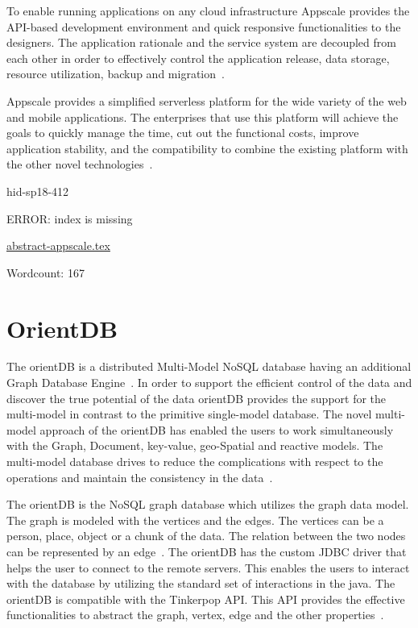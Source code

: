 To enable running applications on any cloud infrastructure Appscale 
provides the API-based development environment and quick responsive 
functionalities to the designers. The application rationale and the 
service system are decoupled from each other in order to effectively 
control the application release, data storage, resource utilization, 
backup and migration~\cite{hid-sp18-412-wiki_appscale}.

Appscale provides a simplified serverless platform for the wide 
variety of the web and mobile applications. The enterprises that use 
this platform will achieve the goals to quickly manage the time, 
cut out the functional costs, improve application stability, and 
the compatibility to combine the existing platform with the other 
novel technologies~\cite{hid-sp18-412-git_appscale}.





\begin{IU}

hid-sp18-412

ERROR: index is missing

\href{https://github.com/cloudmesh-community/hid-sp18-412/blob/master//technology/abstract-appscale.tex}{abstract-appscale.tex}

 

Wordcount: 167

\end{IU}

\section{OrientDB}
The orientDB  is a distributed Multi-Model NoSQL database having an additional
Graph Database Engine~\cite{hid-sp18-412-orientDB_by_CallidusCloud}. In order
to support the efficient control of the data and
discover the true potential of the data orientDB provides the support for the
multi-model in contrast to the primitive single-model database. The novel
multi-model approach of the orientDB has enabled the users to work
simultaneously with the Graph, Document, key-value, geo-Spatial and
reactive models. The multi-model database drives to reduce the
complications with respect to the operations and maintain the consistency
in the data~\cite{hid-sp18-412-orientDB_multimodel}.

The orientDB is the NoSQL graph database which utilizes the graph data model. 
The graph is modeled with the vertices and the edges. The vertices can be a 
person, place, object or a chunk of the data. The relation between the two 
nodes can be represented by an edge~\cite{hid-sp18-412-orientDB_graph}. 
The orientDB has the custom JDBC driver that helps the user to connect 
to the remote servers. This enables the users to interact with the 
database by utilizing the standard set of interactions in the java. 
The orientDB is compatible with the Tinkerpop API. This API provides 
the effective functionalities to abstract the graph, vertex, edge 
and the other properties~\cite{hid-sp18-412-orientDB_graph}.

